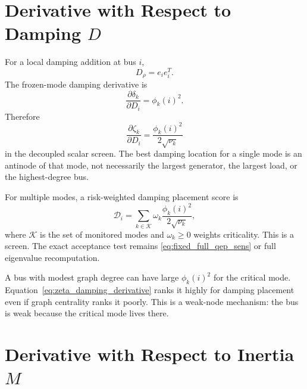 \section{Derivative with Respect to Damping \texorpdfstring{\(D\)}{D}}

For a local damping addition at bus \(i\),
\begin{equation}
  D_\rho=e_ie_i^T.
\end{equation}
The frozen-mode damping derivative is
\begin{equation}
  \frac{\partial\delta_k}{\partial D_i}=\phi_k(i)^2.
  \label{eq:damping_node_derivative}
\end{equation}
Therefore
\begin{equation}
  \frac{\partial\zeta_k}{\partial D_i}
  =
  \frac{\phi_k(i)^2}{2\sqrt{\nu_k}}
  \label{eq:zeta_damping_derivative}
\end{equation}
in the decoupled scalar screen. The best damping location for a single mode is
an antinode of that mode, not necessarily the largest generator, the largest
load, or the highest-degree bus.

For multiple modes, a risk-weighted damping placement score is
\begin{equation}
  \mathcal D_i
  =
  \sum_{k\in\mathcal K}
  \omega_k
  \frac{\phi_k(i)^2}{2\sqrt{\nu_k}},
  \label{eq:damping_placement_score}
\end{equation}
where \(\mathcal K\) is the set of monitored modes and \(\omega_k\ge0\) weights
criticality. This is a screen. The exact acceptance test remains
\eqref{eq:fixed_full_qep_sens} or full eigenvalue recomputation.

\begin{example}
A bus with modest graph degree can have large \(\phi_k(i)^2\) for the critical
mode. Equation~\eqref{eq:zeta_damping_derivative} ranks it highly for damping
placement even if graph centrality ranks it poorly. This is a weak-node
mechanism: the bus is weak because the critical mode lives there.
\end{example}

\section{Derivative with Respect to Inertia \texorpdfstring{\(M\)}{M}}

